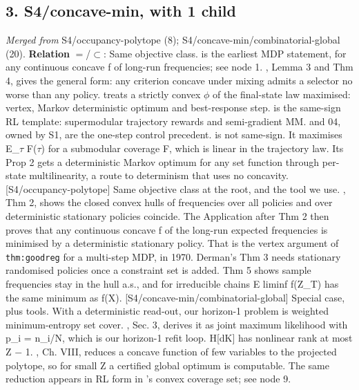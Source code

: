 \documentclass[10pt]{article}
\begin{document}
\subsection{3. S4/concave-min, with 1 child}\label{node:S4-S4-concave-min}
\textit{Merged from} S4/occupancy-polytope (8); S4/concave-min/combinatorial-global (20). \textbf{Relation} $=$/$\subset$: Same objective class. \citet{Derman-finite70ch7} is the earliest MDP statement, for any continuous concave f of long-run frequencies; see node 1. \citet{Piunovskiy-controlled98}, Lemma 3 and Thm 4, gives the general form: any criterion concave under mixing admits a selector no worse than any policy. \citet{Collins-using97} treats a strictly convex \ensuremath{\phi} of the final-state law maximised: vertex, Markov deterministic optimum and best-response step. \citet{DeSanti-global24} is the same-sign RL template: supermodular trajectory rewards and semi-gradient MM. \citet{Touchette-information00} and 04, owned by S1, are the one-step control precedent. \citet{Prajapat-submodular24} is not same-sign. It maximises E\_\ensuremath{\tau} F(\ensuremath{\tau}) for a submodular coverage F, which is linear in the trajectory law. Its Prop 2 gets a deterministic Markov optimum for any set function through per-state multilinearity, a route to determinism that uses no concavity. [S4/occupancy-polytope] Same objective class at the root, and the tool we use. \citet{Derman-finite70ch7}, Thm 2, shows the closed convex hulls of frequencies over all policies and over deterministic stationary policies coincide. The Application after Thm 2 then proves that any continuous concave f of the long-run expected frequencies is minimised by a deterministic stationary policy. That is the vertex argument of \texttt{thm:goodreg} for a multi-step MDP, in 1970. Derman's Thm 3 needs stationary randomised policies once a constraint set is added. Thm 5 shows sample frequencies stay in the hull a.s., and for irreducible chains E liminf f(Z\_T) has the same minimum as f(X). [S4/concave-min/combinatorial-global] Special case, plus tools. With a deterministic read-out, our horizon-1 problem is weighted minimum-entropy set cover. \citet{Halperin-minimum05}, Sec. 3, derives it as joint maximum likelihood with p\_i = n\_i/N, which is our horizon-1 refit loop. H[dK] has nonlinear rank at most \textbar{}Z\textbar{} \ensuremath{-} 1. \citet{Horst-global90}, Ch. VIII, reduces a concave function of few variables to the projected polytope, so for small \textbar{}Z\textbar{} a certified global optimum is computable. The same reduction appears in RL form in \citet{Alegre-optimistic22}'s convex coverage set; see node 9.
\end{document}
